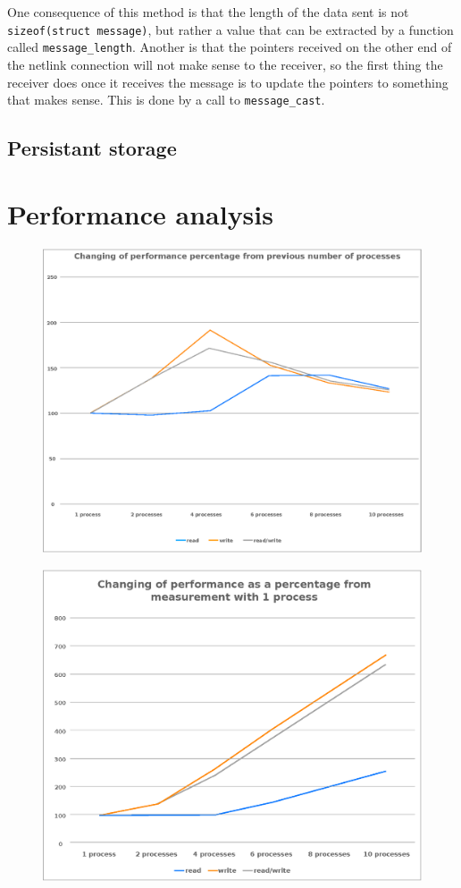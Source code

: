\documentclass[final,a4paper]{article}
\begin{document}
One consequence of this method is that the length of the data sent is not
\texttt{sizeof(struct message)}, but rather a value that can be extracted by a
function called \texttt{message\_length}. Another is that the pointers received
on the other end of the netlink connection will not make sense to the receiver,
so the first thing the receiver does once it receives the message is to update
the pointers to something that makes sense. This is done by a call to
\texttt{message\_cast}.

\subsection*{Persistant storage}

\section*{Performance analysis}
\begin{figure}[h!]
  \centering
  \includegraphics[scale=.7]{percentages.eps}
\end{figure}

\begin{figure}[h!]
  \centering
  \includegraphics[scale=.6]{percentages1.eps}
\end{figure}
\end{document}
